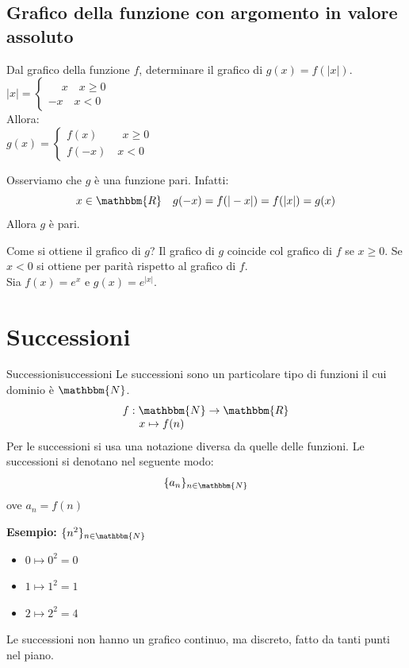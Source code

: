 \documentclass[12pt]{report}
\newcounter{definition}
\newcommand{\nmu}{}
\begin{document}
	\section{Grafico della funzione con argomento in valore assoluto}
	Dal grafico della funzione $f$, determinare il grafico di $g(x)=f(|x|)$. \\
	$|x| = \begin{cases}
		\phantom{-}x \quad x \geq 0 \\
		-x \quad x < 0
	\end{cases}$ \\
	Allora: \\
	$g(x) = \begin{cases}
		f(x)\phantom{-} \quad x \geq 0 \\
		f(-x) \quad x < 0
	\end{cases}$ \\
	\begin{note}{}{}
		Osserviamo che $g$ è una funzione pari. Infatti:
		\[
		x \in \mathbbm{R} \quad g(-x)=f(|-x|)=f(|x|)=g(x)
		\]
		Allora $g$ è pari.
	\end{note}
	Come si ottiene il grafico di $g$? Il grafico di $g$ coincide col grafico di $f$ se $x \geq 0$. Se $x < 0$ si ottiene per parità rispetto al grafico di $f$. \\
	Sia {\color{blue}$f(x)=e^x$} e {\color{red}$g(x)=e^{|x|}$}. \\
	\chapter{Successioni}
	\begin{definition}{\nmu Successioni}{successioni}
		Le successioni sono un particolare tipo di funzioni il cui dominio è $\mathbbm{N}$.
		\[
		\begin{array}{l}
			f: \mathbbm{N} \to \mathbbm{R} \\
			\phantom{f:\ }x \mapsto f(n)
		\end{array}
		\]
		Per le successioni si usa una notazione diversa da quelle delle funzioni. Le successioni si denotano nel seguente modo:
		\[
		\{a_n\}_{n \in \mathbbm{N}}
		\]
		ove $a_n = f(n)$
	\end{definition}
	\textbf{Esempio: $\{n^2\}_{n \in \mathbbm{N}}$}
	\begin{itemize}
		\item $0 \mapsto 0^2 = 0$
		\item $1 \mapsto 1^2 = 1$
		\item $2 \mapsto 2^2 = 4$
	\end{itemize}
	\begin{note}{}{}
		Le successioni non hanno un grafico continuo, ma discreto, fatto da tanti punti nel piano.
	\end{note}
\end{document}
